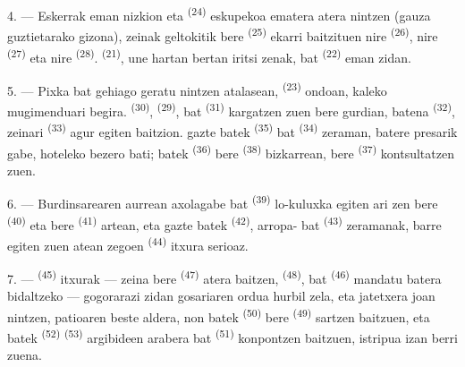 4. --- Eskerrak eman nizkion eta  \textsuperscript{(24)}
eskupekoa ematera atera nintzen (gauza guztietarako gizona), zeinak geltokitik
bere  \textsuperscript{(25)} ekarri baitzituen nire
 \textsuperscript{(26)}, nire 
\textsuperscript{(27)} eta nire  \textsuperscript{(28)}.
 \textsuperscript{(21)}, une hartan bertan iritsi zenak,
 bat \textsuperscript{(22)} eman zidan.

5. --- Pixka bat gehiago geratu nintzen atalasean, 
\textsuperscript{(23)} ondoan, kaleko mugimenduari begira. 
\textsuperscript{(30)},  \textsuperscript{(29)},
 bat \textsuperscript{(31)} kargatzen zuen bere gurdian,
 batena \textsuperscript{(32)}, zeinari  \textsuperscript{(33)} agur egiten baitzion. 
gazte batek \textsuperscript{(35)}  bat \textsuperscript{(34)}
zeraman, batere presarik gabe, hoteleko bezero bati;  batek
\textsuperscript{(36)} bere  \textsuperscript{(38)}
bizkarrean, bere  \textsuperscript{(37)} kontsultatzen zuen.

\VUsaut{4.0mm}
\VUsaut{3.0mm}

6. --- Burdinsarearen aurrean  axolagabe bat
\textsuperscript{(39)} lo-kuluxka egiten ari zen bere 
\textsuperscript{(40)} eta bere 
\textsuperscript{(41)} artean, eta  gazte batek
\textsuperscript{(42)}, arropa- bat \textsuperscript{(43)}
zeramanak, barre egiten zuen atean zegoen 
\textsuperscript{(44)} itxura serioaz.

7. ---  \textsuperscript{(45)} itxurak --- zeina bere
\textsuperscript{(47)} atera baitzen, 
\textsuperscript{(48)},  bat
\textsuperscript{(46)} mandatu batera bidaltzeko --- gogorarazi zidan gosariaren
ordua hurbil zela, eta jatetxera joan nintzen, patioaren beste aldera, non
 batek \textsuperscript{(50)} bere 
\textsuperscript{(49)} sartzen baitzuen, eta  batek
\textsuperscript{(52)}  \textsuperscript{(53)}
argibideen arabera  bat \textsuperscript{(51)}
konpontzen baitzuen, istripua izan berri zuena.


